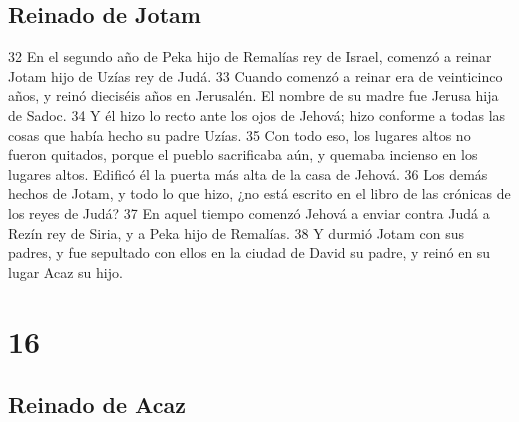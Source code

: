 \section*{Reinado de Jotam}

32 En el segundo año de Peka hijo de Remalías rey de Israel, comenzó a reinar Jotam hijo de Uzías rey de Judá.
33 Cuando comenzó a reinar era de veinticinco años, y reinó dieciséis años en Jerusalén. El nombre de su madre fue Jerusa hija de Sadoc.
34 Y él hizo lo recto ante los ojos de Jehová; hizo conforme a todas las cosas que había hecho su padre Uzías.
35 Con todo eso, los lugares altos no fueron quitados, porque el pueblo sacrificaba aún, y quemaba incienso en los lugares altos. Edificó él la puerta más alta de la casa de Jehová.
36 Los demás hechos de Jotam, y todo lo que hizo, ¿no está escrito en el libro de las crónicas de los reyes de Judá?
37 En aquel tiempo comenzó Jehová a enviar contra Judá a Rezín rey de Siria, y a Peka hijo de Remalías.
38 Y durmió Jotam con sus padres, y fue sepultado con ellos en la ciudad de David su padre, y reinó en su lugar Acaz su hijo.

\chapter{16}

\section*{Reinado de Acaz}

